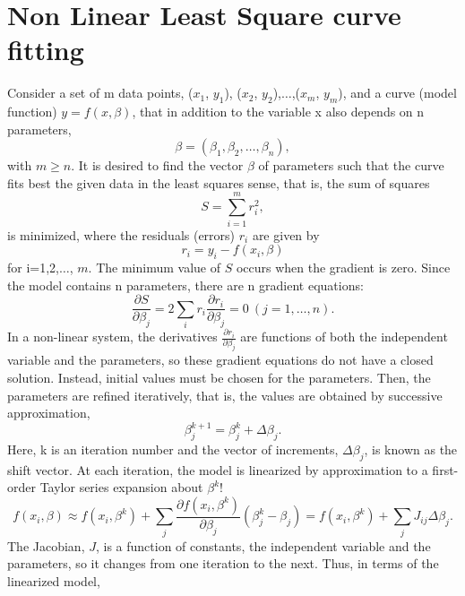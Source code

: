 \documentclass[a4paper,8pt]{report}
\begin{document}
\section{Non Linear Least Square curve fitting}
Consider a set of m data points, ($x_1$, $y_1$), ($x_2$, $y_2$),$\dots$,($x_m$, $y_m$), and a curve (model function) $y=f(x, \beta)$, that in addition to the variable x also depends on n parameters,
\begin{equation}
\beta = (\beta_1, \beta_2, \dots, \beta_n),
\end{equation}
with $m\ge n$. It is desired to find the vector $\beta$ of parameters such that the curve fits best the given data in the least squares sense, that is, the sum of squares
\begin{equation}
    S=\sum_{i=1}^{m}r_i^2 ,
\end{equation}
is minimized, where the residuals (errors) $r_i$ are given by
\begin{equation}
    r_i = y_i - f(x_i,\beta)
\end{equation}
for i=1,2,$\dots$, $m$.
\newline
The minimum value of $S$ occurs when the gradient is zero. Since the model contains n parameters, there are n gradient equations:
\begin{equation}
    \frac{\partial S}{\partial \beta_j}=2\sum_i r_i\frac{\partial r_i}{\partial \beta_j}=0 \ (j=1,\ldots,n).
\end{equation}
In a non-linear system, the derivatives $\frac{\partial r_i}{\partial \beta_j}$ are functions of both the independent variable and the parameters, so these gradient equations do not have a closed solution. Instead, initial values must be chosen for the parameters. Then, the parameters are refined iteratively, that is, the values are obtained by successive approximation,
\begin{equation}
    \beta_j^{k+1}=\beta^k_j+\Delta \beta_j.
\end{equation}
Here, k is an iteration number and the vector of increments, $\Delta \beta_j$, is known as the shift vector. At each iteration, the model is linearized by approximation to a first-order Taylor series expansion about $\beta^k$!
\begin{equation}
    f(x_i,\beta)\approx f(x_i,\beta^k) +\sum_j \frac{\partial f(x_i, \beta^k)}{\partial \beta_j} \left(\beta^k_j -\beta_j \right)=f(x_i, \beta^k)+\sum_j J_{ij} \Delta\beta_j.
\end{equation}
The Jacobian, $J$, is a function of constants, the independent variable and the parameters, so it changes from one iteration to the next. Thus, in terms of the linearized model,
\end{document}
